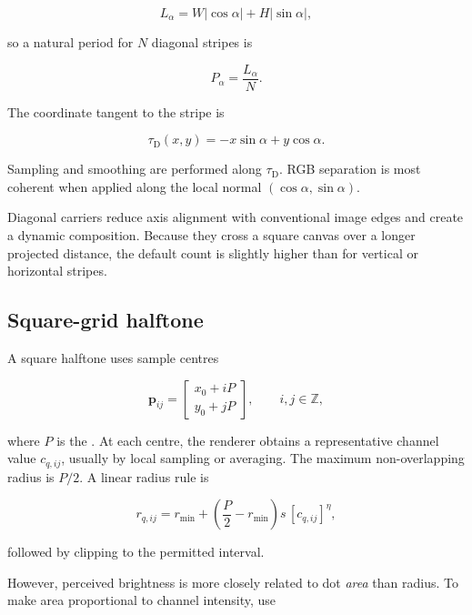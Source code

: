 \begin{equation}
L_{\alpha}=W|\cos\alpha|+H|\sin\alpha|,
\end{equation}

so a natural period for $N$ diagonal stripes is

\begin{equation}
P_{\alpha}=\frac{L_{\alpha}}{N}.
\label{eq:diagonalperiod}
\end{equation}

The coordinate tangent to the stripe is

\begin{equation}
\tau_{\mathrm{D}}(x,y)=-x\sin\alpha+y\cos\alpha.
\end{equation}

Sampling and smoothing are performed along $\tau_{\mathrm{D}}$. RGB separation is most coherent when applied along the local normal $(\cos\alpha,\sin\alpha)$.

Diagonal carriers reduce axis alignment with conventional image edges and create a dynamic composition. Because they cross a square canvas over a longer projected distance, the default count is slightly higher than for vertical or horizontal stripes.

\subsection{Square-grid halftone}

A square halftone uses sample centres

\begin{equation}
\mathbf{p}_{ij}=
\begin{bmatrix}
x_0+iP\\[1mm]y_0+jP
\end{bmatrix},
\qquad i,j\in\mathbb{Z},
\label{eq:squaregrid}
\end{equation}

where $P$ is the . At each centre, the renderer obtains a representative channel value $c_{q,ij}$, usually by local sampling or averaging. The maximum non-overlapping radius is $P/2$. A linear radius rule is

\begin{equation}
r_{q,ij}=r_{\min}+
\left(\frac{P}{2}-r_{\min}\right)
s\,[c_{q,ij}]^{\eta},
\label{eq:radiuslinear}
\end{equation}

followed by clipping to the permitted interval.

However, perceived brightness is more closely related to dot \emph{area} than radius. To make area proportional to channel intensity, use

